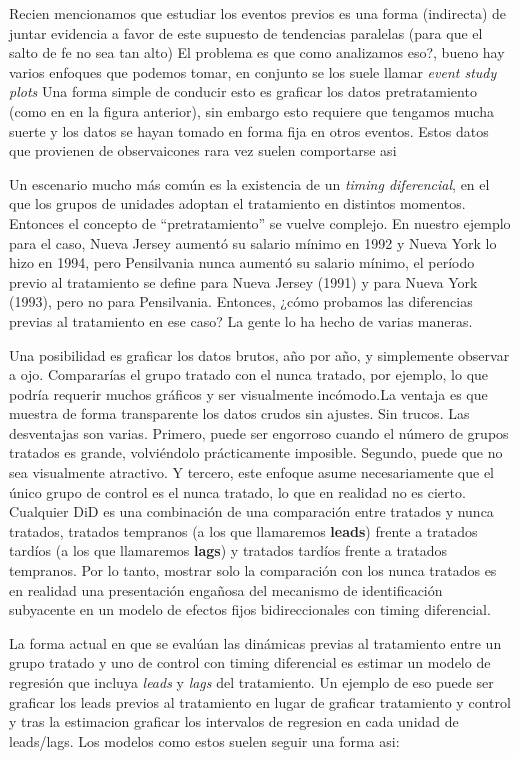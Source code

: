 \documentclass[
  letterpaper,
  DIV=11,
  numbers=noendperiod,
  oneside]{scrreprt}
\begin{document}
Recien mencionamos que estudiar los eventos previos es una forma
(indirecta) de juntar evidencia a favor de este supuesto de tendencias
paralelas (para que el salto de fe no sea tan alto) El problema es que
como analizamos eso?, bueno hay varios enfoques que podemos tomar, en
conjunto se los suele llamar \emph{event study plots} Una forma simple
de conducir esto es graficar los datos pretratamiento (como en en la
figura anterior), sin embargo esto requiere que tengamos mucha suerte y
los datos se hayan tomado en forma fija en otros eventos. Estos datos
que provienen de observaicones rara vez suelen comportarse asi

Un escenario mucho más común es la existencia de un \emph{timing
diferencial}, en el que los grupos de unidades adoptan el tratamiento en
distintos momentos. Entonces el concepto de ``pretratamiento'' se vuelve
complejo. En nuestro ejemplo para el caso, Nueva Jersey aumentó su
salario mínimo en 1992 y Nueva York lo hizo en 1994, pero Pensilvania
nunca aumentó su salario mínimo, el período previo al tratamiento se
define para Nueva Jersey (1991) y para Nueva York (1993), pero no para
Pensilvania. Entonces, ¿cómo probamos las diferencias previas al
tratamiento en ese caso? La gente lo ha hecho de varias maneras.

Una posibilidad es graficar los datos brutos, año por año, y simplemente
observar a ojo. Compararías el grupo tratado con el nunca tratado, por
ejemplo, lo que podría requerir muchos gráficos y ser visualmente
incómodo.La ventaja es que muestra de forma transparente los datos
crudos sin ajustes. Sin trucos. Las desventajas son varias. Primero,
puede ser engorroso cuando el número de grupos tratados es grande,
volviéndolo prácticamente imposible. Segundo, puede que no sea
visualmente atractivo. Y tercero, este enfoque asume necesariamente que
el único grupo de control es el nunca tratado, lo que en realidad no es
cierto. Cualquier DiD es una combinación de una comparación entre
tratados y nunca tratados, tratados tempranos (a los que llamaremos
\textbf{leads}) frente a tratados tardíos (a los que llamaremos
\textbf{lags}) y tratados tardíos frente a tratados tempranos. Por lo
tanto, mostrar solo la comparación con los nunca tratados es en realidad
una presentación engañosa del mecanismo de identificación subyacente en
un modelo de efectos fijos bidireccionales con timing diferencial.

La forma actual en que se evalúan las dinámicas previas al tratamiento
entre un grupo tratado y uno de control con timing diferencial es
estimar un modelo de regresión que incluya \emph{leads} y \emph{lags}
del tratamiento. Un ejemplo de eso puede ser graficar los leads previos
al tratamiento en lugar de graficar tratamiento y control y tras la
estimacion graficar los intervalos de regresion en cada unidad de
leads/lags. Los modelos como estos suelen seguir una forma asi:
\end{document}
